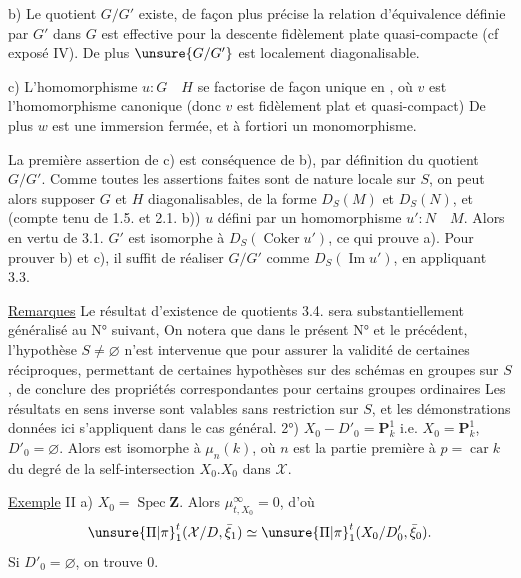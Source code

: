 b) Le quotient $G/G'$ existe, de façon plus précise la relation d'équivalence définie par $G'$ dans $G$ est effective pour la descente fidèlement plate quasi-compacte (cf exposé IV). De plus $\unsure{G/G'}$ est localement diagonalisable.

c)  L'homomorphisme $u:G\quad H$ se factorise de façon unique en
, où $v$ est l'homomorphisme canonique (donc $v$ est fidèlement plat et quasi-compact) De plus $w$ est une immersion fermée, et à fortiori un monomorphisme.

La première assertion de c) est conséquence de b), par définition du quotient $G/G'$. Comme toutes les assertions faites sont de nature locale sur $S$, on peut alors supposer $G$ et $H$  diagonalisables,  de la forme $D_S(M)$ et $D_S(N)$, et (compte tenu de 1.5. et 2.1. b)) $u$ défini par un homomorphisme $u':N\quad M$. Alors en vertu de 3.1. $G'$ est isomorphe à $D_S(\operatorname{Coker}u')$, ce qui prouve a). Pour prouver b) et c), il suffit de réaliser $G/G'$ comme $D_S(\operatorname{Im}u')$, en appliquant 3.3.

\uline{Remarques} Le résultat d'existence de quotients 3.4. sera substantiellement généralisé au N° suivant,  On notera que dans le présent N° et le précédent, l'hypothèse $S\ne\varnothing$ n'est intervenue que pour assurer la validité de certaines réciproques,  permettant de certaines hypothèses sur des schémas en groupes sur $S$, de conclure des propriétés correspondantes pour certains groupes ordinaires Les résultats en sens inverse sont valables sans restriction sur $S$, et les démonstrations données ici s'appliquent dans le cas général.
2°) $\boxed{X_0-D'_0=\mathbf{P}^1_k}$ i.e. $X_0=\mathbf{P}^1_k$, $D'_0=\varnothing$. Alors  est  isomorphe à $\mu_n(k)$, où $n$ est la partie première à $p=\operatorname{car}k$ du degré de la self-intersection $X_0.X_0$ dans $\mathcal{X}$.

\uline{Exemple} II a) $X_0=\operatorname{Spec}\mathbf{Z}$. Alors $\mu_{t,X_0}^\infty=0$,
d'où
\[
\unsure{\Pi|\pi}_1^t(\mathcal{X}/D,\bar\xi_1)\simeq\unsure{\Pi|\pi}_1^t(X_0/D'_0,\bar\xi_0).
\]
 Si $D'_0=\varnothing$, on trouve $0$.

